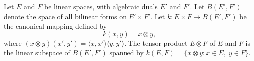 Let $E$ and $F$ be linear spaces, with algebraic duals $E'$ and $F'$. Let $B(E', F')$ denote the space of all bilinear forms on $E' \times F'$. Let $k \colon E \times F \to B(E', F')$ be the canonical mapping defined by
$$k(x, y) = x \otimes y,$$
where $(x \otimes y)(x', y') = \langle x, x' \rangle \langle y, y' \rangle$. The tensor product $E \otimes F$ of $E$ and $F$ is the linear subspace of $B(E', F')$ spanned by $k(E, F) = \{x \otimes y : x \in E,\; y \in F\}$.
